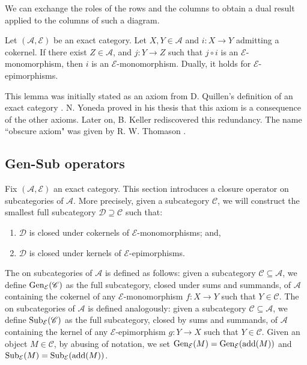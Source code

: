 \begin{remark} \label{rem:dual3x3}
    We can exchange the roles of the rows and the columns to obtain a dual result applied to the columns of such a diagram.
\end{remark}

\begin{lemma} \label{lem:obscure}
Let $(\mathscr{A}, \mathcal{E})$ be an exact category. Let $X,Y \in \mathscr{A}$ and $i : X \longrightarrow Y$ admitting a cokernel. If there exist $Z \in \mathscr{A}$, and $j : Y \longrightarrow Z$ such that $j \circ i$ is an $\mathcal{E}$-monomorphism, then $i$ is an $\mathcal{E}$-monomorphism. Dually, it holds for $\mathcal{E}$-epimorphisms.
\end{lemma}

\begin{remark} \label{rem:obscure}
    This lemma was initially stated as an axiom from D. Quillen's definition of an exact category \cite{Q73}. N. Yoneda proved in his thesis \cite{Y61} that this axiom is a consequence of the other axioms. Later on, B. Keller \cite{K90} rediscovered this redundancy. The name ``obscure axiom" was given by R. W. Thomason \cite{TT07}.
\end{remark}

\subsection{Gen-Sub operators}
\label{ss:GenSuboperators}

Fix $(\mathscr{A},\mathcal{E})$ an exact category. This section introduces a closure operator on subcategories of $\mathscr{A}$. More precisely, given a subcategory $\mathscr{C}$, we will construct the smallest full subcategory $\mathscr{D} \supseteq \mathscr{C}$ such that:
\begin{enumerate}[label=$\bullet$,itemsep=1mm]
    \item $\mathscr{D}$ is closed under cokernels of $\mathcal{E}$-monomorphisms; and,
    \item  $\mathscr{D}$ is closed under kernels of $\mathcal{E}$-epimorphisms.
\end{enumerate}

The  on subcategories of $\mathscr{A}$ is defined as follows: given a subcategory $\mathscr{C} \subseteq \mathscr{A}$, we define $\operatorname{Gen}_\mathcal{E}(\mathscr{C})$ as the full subcategory, closed under sums and summands, of $\mathscr{A}$ containing the cokernel of any $\mathcal{E}$-monomorphism $f : X \longrightarrow Y$ such that $Y \in \mathscr{C}$. The  on subcategories of $\mathscr{A}$ is defined analogously: given a subcategory $\mathscr{C} \subseteq \mathscr{A}$, we define $\operatorname{Sub}_\mathcal{E}(\mathscr{C})$ as the full subcategory, closed by sums and summands, of $\mathscr{A}$ containing the kernel of any $\mathcal{E}$-epimorphism $g : Y \longrightarrow X$  such that $Y \in \mathscr{C}$. Given an object $M \in \mathscr{C}$, by abusing of notation, we set $\operatorname{Gen}_\mathcal{E}(M) = \operatorname{Gen}_\mathcal{E}(\operatorname{add}(M))$ and $\operatorname{Sub}_\mathcal{E}(M) = \operatorname{Sub}_\mathcal{E}(\operatorname{add}(M))$.

